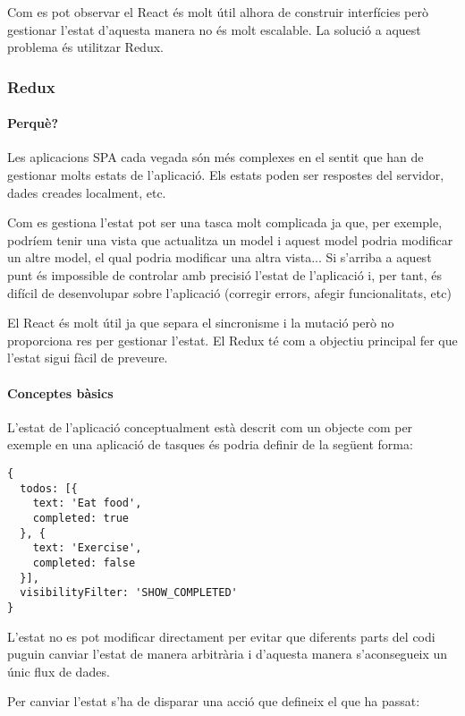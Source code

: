 \documentclass[12pt, titlepage]{article}
\begin{document}
Com es pot observar el React és molt útil alhora de construir interfícies però
gestionar l'estat d'aquesta manera no és molt escalable. La solució a aquest
problema és utilitzar Redux.

\subsubsection{Redux}

\paragraph{Perquè?}

Les aplicacions SPA cada vegada són més complexes en el sentit que han de
gestionar molts estats de l'aplicació. Els estats poden ser respostes del
servidor, dades creades localment, etc.

Com es gestiona l'estat pot ser una tasca molt complicada ja que, per exemple,
podríem tenir una vista que actualitza un model i aquest model podria modificar
un altre model, el qual podria modificar una altra vista... Si s'arriba a aquest
punt és impossible de controlar amb precisió l'estat de l'aplicació i, per tant,
és difícil de desenvolupar sobre l'aplicació (corregir errors, afegir
funcionalitats, etc)

El React és molt útil ja que separa el sincronisme i la mutació però no
proporciona res per gestionar l'estat. El Redux té com a objectiu principal fer
que l'estat sigui fàcil de preveure.

\paragraph{Conceptes bàsics}

L'estat de l'aplicació conceptualment està descrit com un objecte com per exemple
en una aplicació de tasques és podria definir de la següent forma:

\begin{lstlisting}[breaklines]
{
  todos: [{
    text: 'Eat food',
    completed: true
  }, {
    text: 'Exercise',
    completed: false
  }],
  visibilityFilter: 'SHOW_COMPLETED'
}
\end{lstlisting}

L'estat no es pot modificar directament per evitar que diferents parts del codi
puguin canviar l'estat de manera arbitrària i d'aquesta manera s'aconsegueix
un únic flux de dades.

Per canviar l'estat s'ha de disparar una acció que defineix el que ha passat:
\end{document}
